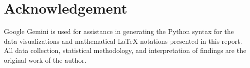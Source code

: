 \documentclass[conference]{IEEEtran}
\begin{document}
\section*{Acknowledgement}
Google Gemini is used for assistance in generating the Python syntax for the data visualizations and mathematical LaTeX notations presented in this report. All data collection, statistical methodology, and interpretation of findings are the original work of the author.


% 
\end{document}

